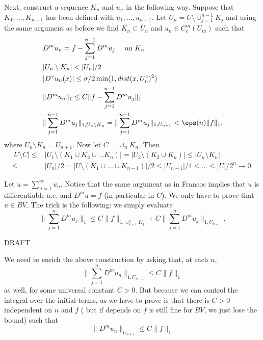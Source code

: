 Next, construct a sequence $K_n$ and $u_n$ in the following way. Suppose that $K_1,\ldots,K_{n-1}$ has been defined with $u_1,\ldots,u_{n-1}$. Let $U_n = U\setminus \cup_{j=1}^{n-1} K_j$ and using the same argument as before we find $K_n\subset U_n$ and $u_n\in C_c^m(U_m)$ such that
\begin{align}
& D^m u_n = f-\sum_{j=1}^{n-1} D^m u_j \quad \text{ on } K_n \\
& |U_n\setminus K_n| < |U_n|/2 \\
& |D^\gamma u_n(x)| \leq \sigma/2 \min(1,dist(x,U_n^c)^2) \\
& \| D^m u_n\|_1 \leq C \|f-\sum_{j=1}^{n-1} D^m u_j\|_1 \\
& \|\sum_{j=1}^{n-1} D^m u_j\|_{1,U_n\setminus K_n} = \|\sum_{j=1}^{n-1} D^m u_j\|_{1,U_{n+1}} < \eps(n) \|f\|_1,
\end{align}
where $U_n\setminus K_n = U_{n+1}$. Now let $C=\cup_n K_n$. Then
\begin{align}
|U\setminus C| \leq & |U_1\setminus (K_1\cup K_2 \cup \ldots K_n)| = |U_2\setminus (K_2 \cup K_n)| \leq |U_n\setminus K_n| \\
\leq & |U_n|/2 = |U\setminus (K_1\cup \ldots \cup K_{n-1})|/2 \leq |U_{n-1}|/4 \leq \ldots \leq |U|/2^n \to 0.
\end{align}

Let $u=\sum_{n=1}^\infty u_n$. Notice that the same argument as in Francos implies that $u$ is differentiable a.e. and $D^m u = f$ (in particular in $C$). We only have to prove that $u\in BV$. The trick is the following: we simply evaluate
\begin{equation}
\|\sum_{j=1}^n D^m u_j\|_1 \leq C \|f\|_{1,\cup_{j=1}^n K_j} + C \|\sum_{j=1}^n D^m u_j \|_{1,U_{n+1}}.
\end{equation}

{\color{red} DRAFT}

We need to enrich the above construction by asking that, at each $n$,
\begin{equation}
\|\sum_{j=1}^n D^m u_n\|_{1,U_{n+1}} \leq C \|f\|_1
\end{equation}
as well, for some universal constant $C>0$. But because we can control the integral over the initial terms, as we have to prove is that there is $C>0$ independent on $n$ and $f$ ({\color{red} but if depends on $f$ is still fine for $BV$, we just lose the bound}) such that
\begin{equation}
\|D^m u_n\|_{U_{n+1}} \leq C \|f\|_1
\end{equation}


